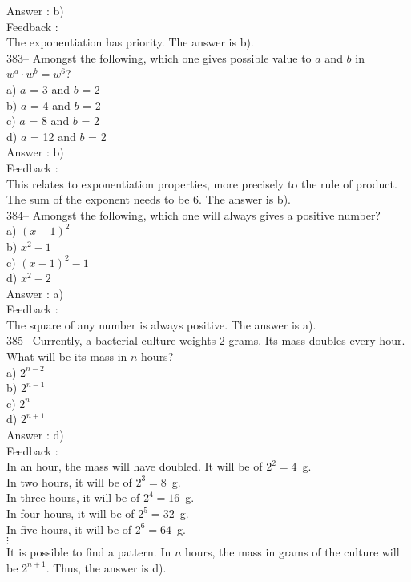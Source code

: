 \documentclass[letterpaper, 12pt]{article}
\begin{document}
Answer : b)\\

Feedback : \\
The exponentiation has priority. The answer is b).\\

383-- Amongst the following, which one gives possible value to $a$ and $b$ in $w^{a}\cdot w^{b}=w^{6}$?\\
a) $a$ = 3 and $b$ = 2\\
b) $a$ = 4 and $b$ = 2\\
c) $a$ = 8 and $b$ = 2\\
d) $a$ = 12 and $b$ = 2\\

Answer : b) \\

Feedback : \\
This relates to exponentiation properties, more precisely to the rule of product. The sum of the exponent needs to be 6. The answer is b).\\


384-- Amongst the following, which one will always gives a positive number?\\
a) $\left( x-1\right) ^2$\\
b) $x^{2}-1$\\
c) $\left( x-1\right) ^2-1$\\
d)  $x^{2}-2$\\

Answer : a)\\

Feedback : \\
The square of any number is always positive. The answer is a).\\

385-- Currently, a bacterial culture weights 2 grams.
Its mass doubles every hour. What will be its mass in $n$ hours?\\
a) $2^{n-2}$\\
b) $2^{n-1}$\\
c) $2^{n}$\\
d) $2^{n+1}$\\

Answer : d)\\


Feedback : \\
In an hour, the mass will have doubled. It will be of $2^{2}=4$~g.\\
In two hours, it will be of $2^{3}=8$~g.\\
In three hours, it will be of $2^{4}=16$~g.\\
In four hours, it will be of $2^{5}=32$~g.\\
In five hours, it will be of $2^{6}=64$~g.\\
$\vdots$\\
It is possible to find a pattern. In $n$ hours, the mass in grams of the culture will be $2^{n+1}$.  Thus, the answer is d).\\
\end{document}
